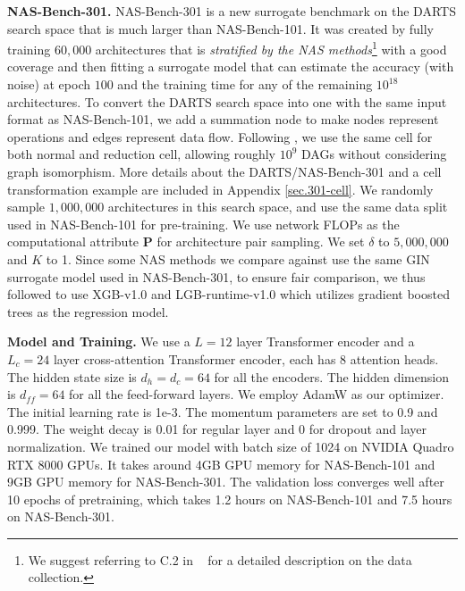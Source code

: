 \textbf{NAS-Bench-301.}
NAS-Bench-301 \cite{julien2020nas301} is a new surrogate benchmark on the DARTS \cite{liu2018darts} search space that is much larger than NAS-Bench-101. It 
was created by fully training $60,000$ architectures that is \emph{stratified by the NAS methods}\footnote{We suggest referring to C.2 in ~\citep{julien2020nas301} for a detailed description on the data collection.} with a good coverage and then fitting a surrogate model that can estimate the accuracy (with noise) at epoch $100$ and the training time for any of the remaining $10^{18}$ architectures.
To convert the DARTS search space into one with the same input format as NAS-Bench-101, we add a summation node to make nodes represent operations and edges represent data flow. Following \cite{liu2018progressive}, we use the same cell for both normal and reduction cell, allowing roughly $10^9$ DAGs without considering graph isomorphism. More details about the DARTS/NAS-Bench-301 and a cell transformation example are included in Appendix \ref{sec.301-cell}. 
We randomly sample $1,000,000$ architectures in this search space, and use the same data split used in NAS-Bench-101 for pre-training. We use network FLOPs as the computational attribute $\mathbf{P}$ for architecture pair sampling. We set $\delta$ to $5,000,000$ and $K$ to 1. Since some NAS methods we compare against use the same GIN \cite{xu2018how} surrogate model used in NAS-Bench-301, to ensure fair comparison, we thus followed \cite{julien2020nas301} to use XGB-v1.0 and LGB-runtime-v1.0 which utilizes gradient boosted trees \cite{Chen:2016:XST:2939672.2939785,NIPS2017_6449f44a} as the regression model. 

\textbf{Model and Training.}
We use a $L = 12$ layer Transformer encoder and a $L_c = 24$ layer cross-attention Transformer encoder, each has 8 attention heads. The hidden state size is $d_h =d_c = 64$ for all the encoders. The hidden dimension is $d_{ff} = 64$ for all the feed-forward layers.
We employ AdamW \cite{loshchilov2017decoupled} as our optimizer.
The initial learning rate is 1e-3.
The momentum parameters are set to 0.9 and 0.999.
The weight decay is 0.01 for regular layer and 0 for dropout and layer normalization.
We trained our model with batch size of 1024 on NVIDIA Quadro RTX 8000 GPUs. It takes around 4GB GPU memory for NAS-Bench-101 and 9GB GPU memory for NAS-Bench-301. The validation loss converges well after 10 epochs of pretraining, which takes 1.2 hours on NAS-Bench-101 and 7.5 hours on NAS-Bench-301. 

